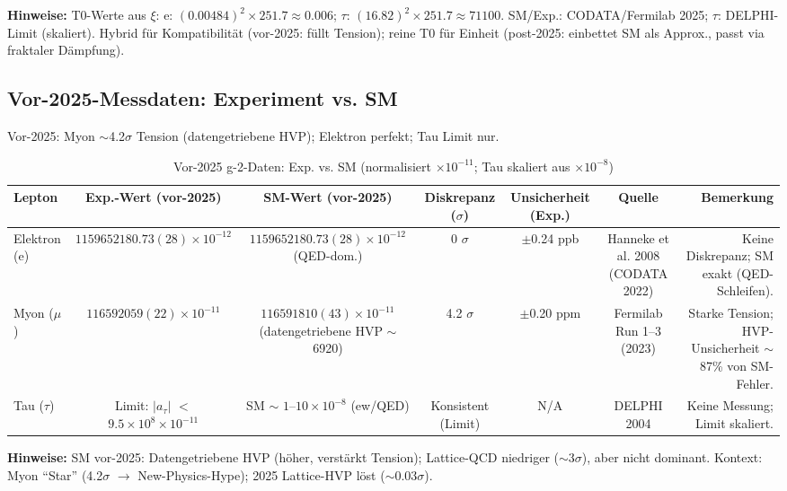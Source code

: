 \documentclass[12pt,a4paper]{article}
\begin{document}
	\textbf{Hinweise:} T0-Werte aus $\xi$: e: $(0.00484)^2 \times 251.7 \approx 0.006$; $\tau$: $(16.82)^2 \times 251.7 \approx 71100$. SM/Exp.: CODATA/Fermilab 2025; $\tau$: DELPHI-Limit (skaliert). Hybrid für Kompatibilität (vor-2025: füllt Tension); reine T0 für Einheit (post-2025: einbettet SM als Approx., passt via fraktaler Dämpfung).
	
	\subsection{Vor-2025-Messdaten: Experiment vs. SM}
	
	Vor-2025: Myon $\sim$4.2$\sigma$ Tension (datengetriebene HVP); Elektron perfekt; Tau Limit nur.
	
	\begin{table}[ht!]
		\centering
		\small
		\begin{adjustbox}{max width=\textwidth}
			\begin{tabular}{lcccccr}
				\toprule
				Lepton & Exp.-Wert (vor-2025) & SM-Wert (vor-2025) & Diskrepanz ($\sigma$) & Unsicherheit (Exp.) & Quelle & Bemerkung \\
				\midrule
				Elektron (e) & $1159652180.73(28) \times 10^{-12}$ & $1159652180.73(28) \times 10^{-12}$ (QED-dom.) & 0 $\sigma$ & $\pm$0.24 ppb & Hanneke et al. 2008 (CODATA 2022) & Keine Diskrepanz; SM exakt (QED-Schleifen). \\
				Myon ($\mu$) & $116592059(22) \times 10^{-11}$ & $116591810(43) \times 10^{-11}$ (datengetriebene HVP $\sim$6920) & 4.2 $\sigma$ & $\pm$0.20 ppm & Fermilab Run 1--3 (2023) & Starke Tension; HVP-Unsicherheit $\sim$87\% von SM-Fehler. \\
				Tau ($\tau$) & Limit: $|a_\tau|$ $<$ $9.5 \times 10^{8} \times 10^{-11}$ & SM $\sim$ $1$--$10 \times 10^{-8}$ (ew/QED) & Konsistent (Limit) & N/A & DELPHI 2004 & Keine Messung; Limit skaliert. \\
				\bottomrule
			\end{tabular}
		\end{adjustbox}
		\caption{Vor-2025 g-2-Daten: Exp. vs. SM (normalisiert $ \times 10^{-11}$; Tau skaliert aus $ \times 10^{-8}$)}
		\label{tab:pre2025}
	\end{table}
	
	\textbf{Hinweise:} SM vor-2025: Datengetriebene HVP (höher, verstärkt Tension); Lattice-QCD niedriger ($\sim$3$\sigma$), aber nicht dominant. Kontext: Myon ``Star'' (4.2$\sigma$ $\to$ New-Physics-Hype); 2025 Lattice-HVP löst ($\sim$0.03$\sigma$).
	
\end{document}

